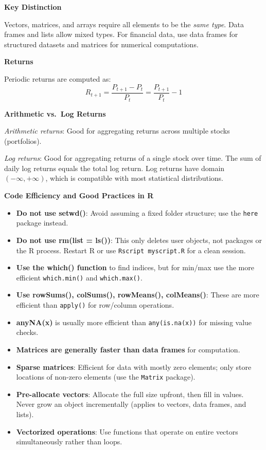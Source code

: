 \documentclass[12pt,a4paper]{article}
\begin{document}
\vspace{0.5em}

\textbf{Key Distinction}

Vectors, matrices, and arrays require all elements to be the \textit{same type}. Data frames and lists allow mixed types. For financial data, use data frames for structured datasets and matrices for numerical computations.

\vspace{1em}

\textbf{Returns}

Periodic returns are computed as:
\[
R_{t+1} = \frac{P_{t+1} - P_t}{P_t} = \frac{P_{t+1}}{P_t} - 1
\]

\vspace{0.5em}

\textbf{Arithmetic vs.\ Log Returns}

\textit{Arithmetic returns}: Good for aggregating returns across multiple stocks (portfolios).

\textit{Log returns}: Good for aggregating returns of a single stock over time. The sum of daily log returns equals the total log return. Log returns have domain $(-\infty, +\infty)$, which is compatible with most statistical distributions.

\vspace{0.5em}

\textbf{Code Efficiency and Good Practices in R}

\begin{itemize}
    \item \textbf{Do not use setwd()}: Avoid assuming a fixed folder structure; use the \texttt{here} package instead.
    \item \textbf{Do not use rm(list = ls())}: This only deletes user objects, not packages or the R process. Restart R or use \texttt{Rscript myscript.R} for a clean session.
    \item \textbf{Use the which() function} to find indices, but for min/max use the more efficient \texttt{which.min()} and \texttt{which.max()}.
    \item \textbf{Use rowSums(), colSums(), rowMeans(), colMeans()}: These are more efficient than \texttt{apply()} for row/column operations.
    \item \textbf{anyNA(x)} is usually more efficient than \texttt{any(is.na(x))} for missing value checks.
    \item \textbf{Matrices are generally faster than data frames} for computation.
    \item \textbf{Sparse matrices}: Efficient for data with mostly zero elements; only store locations of non-zero elements (use the \texttt{Matrix} package).
    \item \textbf{Pre-allocate vectors}: Allocate the full size upfront, then fill in values. Never grow an object incrementally (applies to vectors, data frames, and lists).
    \item \textbf{Vectorized operations}: Use functions that operate on entire vectors simultaneously rather than loops.
\end{itemize}
\end{document}
